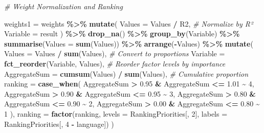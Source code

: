 \documentclass[
]{article}
\newenvironment{Shaded}{\begin{snugshade}}{\end{snugshade}}
\newcommand{\AttributeTok}[1]{\textcolor[rgb]{0.13,0.29,0.53}{#1}}
\newcommand{\CommentTok}[1]{\textcolor[rgb]{0.56,0.35,0.01}{\textit{#1}}}
\newcommand{\DecValTok}[1]{\textcolor[rgb]{0.00,0.00,0.81}{#1}}
\newcommand{\FloatTok}[1]{\textcolor[rgb]{0.00,0.00,0.81}{#1}}
\newcommand{\FunctionTok}[1]{\textcolor[rgb]{0.13,0.29,0.53}{\textbf{#1}}}
\newcommand{\NormalTok}[1]{#1}
\newcommand{\OtherTok}[1]{\textcolor[rgb]{0.56,0.35,0.01}{#1}}
\newcommand{\SpecialCharTok}[1]{\textcolor[rgb]{0.81,0.36,0.00}{\textbf{#1}}}
\begin{document}
\begin{Shaded}
\begin{Highlighting}[]
\CommentTok{\# Weight Normalization and Ranking}

\NormalTok{weights1 }\OtherTok{=}\NormalTok{ weights }\SpecialCharTok{\%\textgreater{}\%}
  \FunctionTok{mutate}\NormalTok{(}
    \AttributeTok{Values =}\NormalTok{ Values }\SpecialCharTok{/}\NormalTok{ R2,  }\CommentTok{\# Normalize by R²}
    \AttributeTok{Variable =}\NormalTok{ result  }
\NormalTok{  ) }\SpecialCharTok{\%\textgreater{}\%}
  \FunctionTok{drop\_na}\NormalTok{() }\SpecialCharTok{\%\textgreater{}\%}
  \FunctionTok{group\_by}\NormalTok{(Variable) }\SpecialCharTok{\%\textgreater{}\%}
  \FunctionTok{summarise}\NormalTok{(}\AttributeTok{Values =} \FunctionTok{sum}\NormalTok{(Values)) }\SpecialCharTok{\%\textgreater{}\%}
  \FunctionTok{arrange}\NormalTok{(}\SpecialCharTok{{-}}\NormalTok{Values) }\SpecialCharTok{\%\textgreater{}\%}
  \FunctionTok{mutate}\NormalTok{(}
    \AttributeTok{Values =}\NormalTok{ Values }\SpecialCharTok{/} \FunctionTok{sum}\NormalTok{(Values),  }\CommentTok{\# Convert to proportions}
    \AttributeTok{Variable =} \FunctionTok{fct\_reorder}\NormalTok{(Variable, Values),  }\CommentTok{\# Reorder factor levels by importance}
    \AttributeTok{AggregateSum =} \FunctionTok{cumsum}\NormalTok{(Values) }\SpecialCharTok{/} \FunctionTok{sum}\NormalTok{(Values),  }\CommentTok{\# Cumulative proportion}
    \AttributeTok{ranking =} \FunctionTok{case\_when}\NormalTok{(}
\NormalTok{      AggregateSum }\SpecialCharTok{\textgreater{}} \FloatTok{0.95} \SpecialCharTok{\&}\NormalTok{ AggregateSum }\SpecialCharTok{\textless{}=} \FloatTok{1.01} \SpecialCharTok{\textasciitilde{}} \DecValTok{4}\NormalTok{,}
\NormalTok{      AggregateSum }\SpecialCharTok{\textgreater{}} \FloatTok{0.90} \SpecialCharTok{\&}\NormalTok{ AggregateSum }\SpecialCharTok{\textless{}=} \FloatTok{0.95} \SpecialCharTok{\textasciitilde{}} \DecValTok{3}\NormalTok{,}
\NormalTok{      AggregateSum }\SpecialCharTok{\textgreater{}} \FloatTok{0.80} \SpecialCharTok{\&}\NormalTok{ AggregateSum }\SpecialCharTok{\textless{}=} \FloatTok{0.90} \SpecialCharTok{\textasciitilde{}} \DecValTok{2}\NormalTok{,}
\NormalTok{      AggregateSum }\SpecialCharTok{\textgreater{}} \FloatTok{0.00} \SpecialCharTok{\&}\NormalTok{ AggregateSum }\SpecialCharTok{\textless{}=} \FloatTok{0.80} \SpecialCharTok{\textasciitilde{}} \DecValTok{1}
\NormalTok{    ),}
    \AttributeTok{ranking =} \FunctionTok{factor}\NormalTok{(ranking, }\AttributeTok{levels =}\NormalTok{ RankingPriorities[, }\DecValTok{2}\NormalTok{], }\AttributeTok{labels =}\NormalTok{ RankingPriorities[, }\DecValTok{4} \SpecialCharTok{{-}}\NormalTok{ language])}
\NormalTok{  )}
\end{Highlighting}
\end{Shaded}
\end{document}

